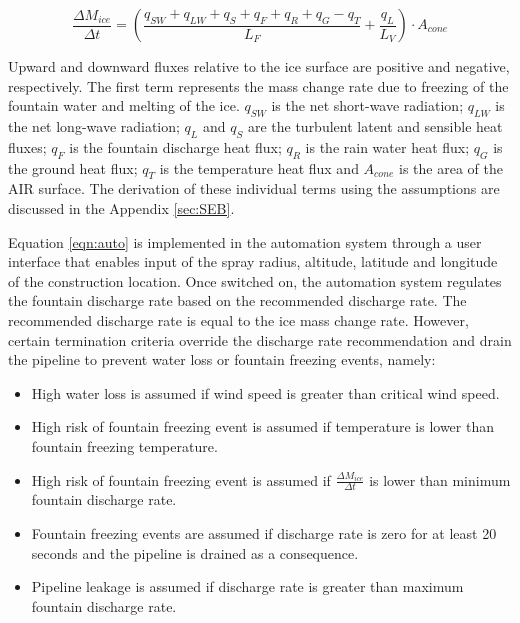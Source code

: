 \documentclass[tc, manuscript]{copernicus}
\begin{document}
\begin{equation}
  \frac{\Delta M_{ice}}{\Delta t}  =  (\frac{q_{SW} + q_{LW} + q_{S} + q_{F} + q_{R} + q_{G} - q_{T}}{L_F} + \frac{q_{L}}{L_V} ) \cdot A_{cone}
	\label{eqn:auto}
\end{equation}

Upward and downward fluxes relative to the ice surface are positive and negative, respectively. The first term
represents the mass change rate due to freezing of the fountain water and melting of the ice. $q_{SW}$ is the
net short-wave radiation; $q_{LW}$ is the net long-wave radiation; $q_{L}$ and $q_{S}$ are the turbulent latent
and sensible heat fluxes; $q_{F}$ is the fountain discharge heat flux; $q_{R}$ is the rain water heat
flux; $q_{G}$ is the ground heat flux; $q_{T}$ is the temperature heat flux and $A_{cone}$ is the area of the
AIR surface. The derivation of these individual terms using the assumptions are discussed in the Appendix
\ref{sec:SEB}.

Equation \ref{eqn:auto} is implemented in the automation system through a user interface that enables input of
the spray radius, altitude, latitude and longitude of the construction location. Once switched on, the
automation system regulates the fountain discharge rate based on the recommended discharge rate. The recommended
discharge rate is equal to the ice mass change rate. However, certain termination criteria override the
discharge rate recommendation and drain the pipeline to prevent water loss or fountain freezing events, namely: 

\begin{itemize}

\item High water loss is assumed if wind speed is greater than critical wind speed.

\item High risk of fountain freezing event is assumed if temperature is lower than fountain freezing temperature.

\item High risk of fountain freezing event is assumed if $\frac{\Delta M_{ice}}{\Delta t}$ is lower than minimum fountain discharge rate. 

\item Fountain freezing events are assumed if discharge rate is zero for at least 20 seconds and the pipeline is drained as a
  consequence.

\item Pipeline leakage is assumed if discharge rate is greater than maximum fountain discharge rate.

\end{itemize}
\end{document}
